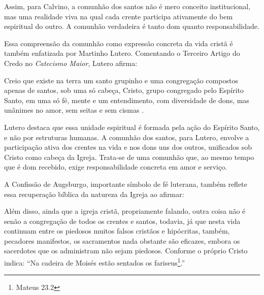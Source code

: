 Assim, para Calvino, a comunhão dos santos não é mero conceito institucional, mas uma realidade viva na qual cada crente participa ativamente do bem espiritual do outro. A comunhão verdadeira é tanto dom quanto responsabilidade.

Essa compreensão da comunhão como expressão concreta da vida cristã é também enfatizada por Martinho Lutero. Comentando o Terceiro Artigo do Credo no \textit{Catecismo Maior}, Lutero afirma:

\begin{citacao}
    Creio que existe na terra um santo grupinho e uma congregação compostos apenas de santos, sob uma só cabeça, Cristo, grupo congregado pelo Espírito Santo, em uma só fé, mente e um entendimento, com diversidade de dons, mas unânimes no amor, sem seitas e sem cismas \cite[p.~454]{livroConcordia}.
\end{citacao}

Lutero destaca que essa unidade espiritual é formada pela ação do Espírito Santo, e não por estruturas humanas. A comunhão dos santos, para Lutero, envolve a participação ativa dos crentes na vida e nos dons uns dos outros, unificados sob Cristo como cabeça da Igreja. Trata-se de uma comunhão que, ao mesmo tempo que é dom recebido, exige responsabilidade concreta em amor e serviço.

A Confissão de Augsburgo, importante símbolo de fé luterana, também reflete essa recuperação bíblica da natureza da Igreja ao afirmar:

\begin{citacao}
    Além disso, ainda que a igreja cristã, propriamente falando, outra coisa não é senão a congregação de todos os crentes e santos, todavia, já que nesta vida continuam entre os piedosos muitos falsos cristãos e hipócritas, também, pecadores manifestos, os sacramentos nada obstante são eficazes, embora os sacerdotes que os administram não sejam piedosos. Conforme o próprio Cristo indica: ``Na cadeira de Moisés estão sentados os fariseus\footnote{Mateus 23.2}.''\cite[Artigo~VII, p.~32]{livroConcordia}
\end{citacao}


